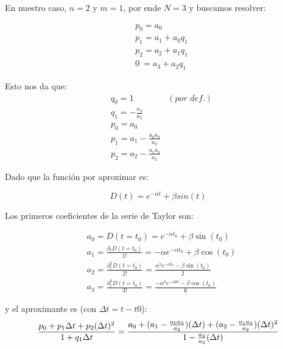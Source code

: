 En nuestro caso, $n = 2$ y $m = 1$, por ende $N = 3$ y buscamos resolver:

\begin{align*}
	&p_0 = a_0 \\
	&p_1 = a_1 + a_0 q_1 \\
	&p_2 = a_2 + a_1 q_1 \\
	&0 ~ = a_3 + a_2 q_1
\end{align*}


Esto nos da que:
\begin{align*}
	&q_0 = 1 ~ &(\textit{por def.}) \\
	&q_1 = - \frac{a_3}{a_2} \\
	&p_0 = a_0 \\
	&p_1 = a_1 - \frac{ a_0 a_3 }{ a_2 } \\
	&p_2 = a_2 - \frac{ a_1 a_3 }{a_2}
\end{align*}



Dado que la función por aproximar es:

$$ D(t) = e^{-\alpha t} + \beta sin(t) $$

Los primeros coeficientes de la serie de Taylor son:

\begin{align*}
	&a_0 = D(t=t_0)  = e^{-\alpha t_0} + \beta \sin(t_0) \\
	&a_1 = \frac{\partial_t D(t=t_0)}{1!} 
	= -\alpha e^{-\alpha t_0} + \beta \cos(t_0) \\
	&a_2 = \frac{\partial_t^2 D(t=t_0)}{2!}
	= \frac{\alpha^2 e^{-\alpha t_0} - \beta \sin(t_0)}{2}
	 \\
	&a_3 = \frac{\partial_t^3 D(t=t_0)}{3!}
	= \frac{-\alpha^3 e^{-\alpha t0} - \beta \cos(t_0)}{6}	
\end{align*}

y el aproximante es (con $ \Delta t = t - t0$): 
$$
\frac{p_0 + p_1 \Delta t + p_2 (\Delta t)^2} { 1 + q_1 \Delta t } = \\
\frac{
	a_0 + (a_1 - \frac{ a_0 a_3 }{ a_2 })(\Delta t) + (a_2 - \frac{ a_1 a_3 }{a_2})(\Delta t)^2
}{
1 - \frac{a_3}{a_2}(\Delta t)
} 
$$


